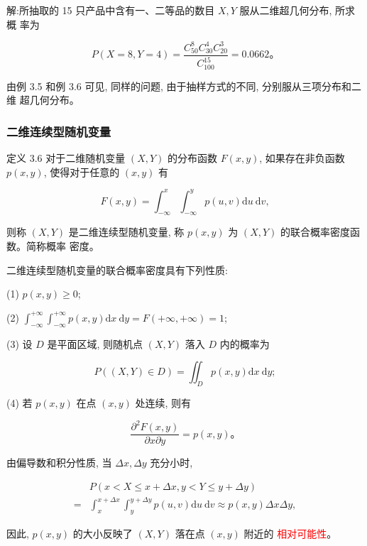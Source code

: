 \documentclass{beamer}
\newcommand{\new}[1]{\textcolor{red}{#1}}
\begin{document}
	\begin{frame}
		解:所抽取的 15 只产品中含有一、二等品的数目 $X, Y$ 服从二维超几何分布, 所求概 率为
		
		$$
		P(X=8, Y=4)=\frac{C_{50}^{8} C_{30}^{4} C_{20}^{3}}{C_{100}^{15}}=0.0662 。
		$$
		
		由例 3.5 和例 3.6 可见, 同样的问题, 由于抽样方式的不同, 分别服从三项分布和二维 超几何分布。
	\end{frame}
	 
	\begin{frame}
		\frametitle{二维连续型随机变量}
		定义 3.6 对于二维随机变量 $(X, Y)$ 的分布函数 $F(x, y)$, 如果存在非负函数 $p(x, y)$, 使得对于任意的 $(x, y)$ 有
		
		$$
		F(x, y)=\int_{-\infty}^{x} \int_{-\infty}^{y} p(u, v) \mathrm{d} u \mathrm{~d} v,
		$$
		
		则称 $(X, Y)$ 是二维连续型随机变量, 称 $p(x, y)$ 为 $(X, Y)$ 的联合概率密度函数。简称概率 密度。
	\end{frame}
	
	\begin{frame}
		二维连续型随机变量的联合概率密度具有下列性质:
		
		(1) $p(x, y) \geqslant 0$;
		
		(2) $\int_{-\infty}^{+\infty} \int_{-\infty}^{+\infty} p(x, y) \mathrm{d} x \mathrm{~d} y=F(+\infty,+\infty)=1$;
		
		(3) 设 $D$ 是平面区域, 则随机点 $(X, Y)$ 落入 $D$ 内的概率为
		
		$$
		P((X, Y) \in D)=\iint_{D} p(x, y) \mathrm{d} x \mathrm{~d} y ;
		$$
		
		(4) 若 $p(x, y)$ 在点 $(x, y)$ 处连续, 则有
		
		$$
		\frac{\partial^{2} F(x, y)}{\partial x \partial y}=p(x, y) 。
		$$
		
		由偏导数和积分性质, 当 $\Delta x, \Delta y$ 充分小时,
		
		$$
		\begin{aligned}
			& P(x<X \leqslant x+\Delta x, y<Y \leqslant y+\Delta y) \\
			= & \int_{x}^{x+\Delta x} \int_{y}^{y+\Delta y} p(u, v) \mathrm{d} u \mathrm{~d} v \approx p(x, y) \Delta x \Delta y,
		\end{aligned}
		$$
		
		因此, $p(x, y)$ 的大小反映了 $(X, Y)$ 落在点 $(x, y)$ 附近的
		\new{相对可能性}。
	\end{frame}
	
\end{document}
